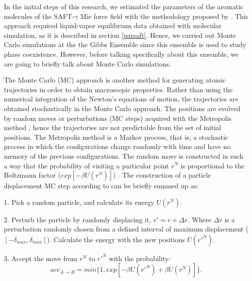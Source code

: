 	In the initial steps of this research, we estimated the parameters of the aromatic molecules of the SAFT-$\gamma$ Mie force field with the methodology proposed by . This approach required liquid-vapor equilibrium data obtained with molecular simulation, as it is described in section \ref{parsaft}. Hence, we carried out Monte Carlo simulations at the the Gibbs Ensemble \cite{papa1987} since this ensemble is used to study phase coexistence. However, before talking specifically about this ensemble, we are going to briefly talk about Monte Carlo simulations.
	
	The Monte Carlo (MC) approach is another method for generating atomic trajectories in order to obtain macroscopic properties. Rather than using the numerical integration of the Newton's equations of motion, the trajectories are obtained stochastically in the Monte Carlo approach. The positions are evolved by random moves or perturbations (MC steps) acquired with the Metropolis method \cite{1953JChPh..21.1087M}, hence the trajectories are not predictable from the set of initial positions. The Metropolis method is a Markov process, that is, a stochastic process in which the configurations change randomly with time and have no memory of the previous configurations. The random move is constructed in such a way that the probability of visiting a particular point $r^{N}$ is proportional to the Boltzmann factor ($exp[-\beta U(r^{N})]$) \cite{frenkel}. The construction of a  particle displacement MC step according to  can be briefly summed up as:
	
	1. Pick a random particle, and calculate its energy $U(r^{N})$.
	
	2. Perturb the particle by randomly displacing  it, $r' = r +\Delta r$. Where $\Delta r$ is a perturbation randomly chosen from a defined interval of maximum displacement ($[- \delta _{max},\delta _{max}]$). Calculate the energy with the new positions $U(r'^{N})$.
	
	3. Accept the move from $r^{N}$ to $r'^{N}$ with the probability:
	\begin{equation}
	acc_{A \rightarrow B} = min \lbrace 1,exp[-\beta U(r'^{N}) + \beta U(r^{N}) ] \rbrace .
	\end{equation}
	

